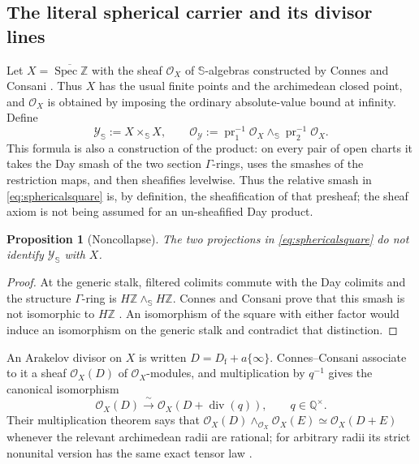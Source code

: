 \documentclass[11pt]{amsart}
\newtheorem{proposition}[theorem]{Proposition}
\theoremstyle{definition}
\theoremstyle{remark}
\newcommand{\Z}{\mathbb Z}
\newcommand{\Q}{\mathbb Q}
\newcommand{\divv}{\operatorname{div}}
\newcommand{\Spec}{\operatorname{Spec}}
\begin{document}
\subsection{The literal spherical carrier and its divisor lines}

Let $X=\overline{\Spec\Z}$ with the sheaf $\mathcal O_X$ of
$\mathbb S$-algebras constructed by Connes and Consani
\cite[Proposition~6.3]{CC-AbsoluteAlgebra}.  Thus $X$ has the usual finite
points and the archimedean closed point, and $\mathcal O_X$ is obtained by
imposing the ordinary absolute-value bound at infinity.  Define
\begin{equation}\label{eq:sphericalsquare}
 \mathscr Y_{\mathbb S}:=X\times_{\mathbb S}X,
 \qquad
 \mathcal O_{\mathscr Y}:=\operatorname{pr}_1^{-1}\mathcal O_X
       \wedge_{\mathbb S}\operatorname{pr}_2^{-1}\mathcal O_X.
\end{equation}
This formula is also a construction of the product: on every pair of open
charts it takes the Day smash of the two section $\Gamma$-rings, uses the
smashes of the restriction maps, and then sheafifies levelwise.  Thus the
relative smash in \eqref{eq:sphericalsquare} is, by definition, the
sheafification of that presheaf; the sheaf axiom is not being assumed for an
un-sheafified Day product.

\begin{proposition}[Noncollapse]\label{prop:sphericalnoncollapse}
The two projections in \eqref{eq:sphericalsquare} do not identify
$\mathscr Y_{\mathbb S}$ with $X$.
\end{proposition}

\begin{proof}
At the generic stalk, filtered colimits commute with the Day colimits and
the structure $\Gamma$-ring is
$H\Z\wedge_{\mathbb S}H\Z$.  Connes and Consani prove that this smash is not
isomorphic to $H\Z$ \cite[Proposition~7.4]{CC-AbsoluteAlgebra}.  An isomorphism of the square with either factor would induce an
isomorphism on the generic stalk and contradict that distinction.
\end{proof}

An Arakelov divisor on $X$ is written $D=D_{\mathrm f}+a\{\infty\}$.
Connes--Consani associate to it a sheaf $\mathcal O_X(D)$ of
$\mathcal O_X$-modules, and multiplication by $q^{-1}$ gives the canonical
isomorphism
\begin{equation}\label{eq:principalmodule}
 \mathcal O_X(D)\xrightarrow{\ \sim\ }
 \mathcal O_X(D+\divv(q)),\qquad q\in\Q^\times.
\end{equation}
Their multiplication theorem says that
$\mathcal O_X(D)\wedge_{\mathcal O_X}\mathcal O_X(E)\simeq
\mathcal O_X(D+E)$ whenever the relevant archimedean radii are rational;
for arbitrary radii its strict nonunital version has the same exact tensor
law \cite[Proposition~6.4 and Remark~6.5]{CC-AbsoluteAlgebra}.
\end{document}
